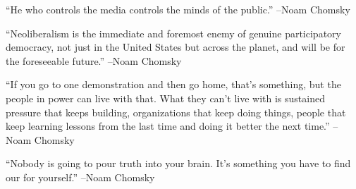 \documentclass{article}%
\begin{document}
\linebreak%
\vspace{1mm}%
\begin{minipage}{\textwidth}%
\flushleft%
“He who controls the media controls the minds of the public.”%
\linebreak%
\vspace{1mm}%
–Noam Chomsky%
\linebreak%
\vspace{1mm}%
\end{minipage}%
\linebreak%
\vspace{1mm}%
\begin{minipage}{\textwidth}%
\flushleft%
“Neoliberalism is the immediate and foremost enemy of genuine participatory democracy, not just in the United States but across the planet, and will be for the foreseeable future.”%
\linebreak%
\vspace{1mm}%
–Noam Chomsky%
\linebreak%
\vspace{1mm}%
\end{minipage}%
\linebreak%
\vspace{1mm}%
\begin{minipage}{\textwidth}%
\flushleft%
“If you go to one demonstration and then go home, that's something, but the people in power can live with that. What they can't live with is sustained pressure that keeps building, organizations that keep doing things, people that keep learning lessons from the last time and doing it better the next time.”%
\linebreak%
\vspace{1mm}%
–Noam Chomsky%
\linebreak%
\vspace{1mm}%
\end{minipage}%
\linebreak%
\vspace{1mm}%
\begin{minipage}{\textwidth}%
\flushleft%
“Nobody is going to pour truth into your brain. It's something you have to find our for yourself.”%
\linebreak%
\vspace{1mm}%
–Noam Chomsky%
\linebreak%
\vspace{1mm}%
\end{minipage}%
\linebreak%
\vspace{1mm}%
\end{document}
